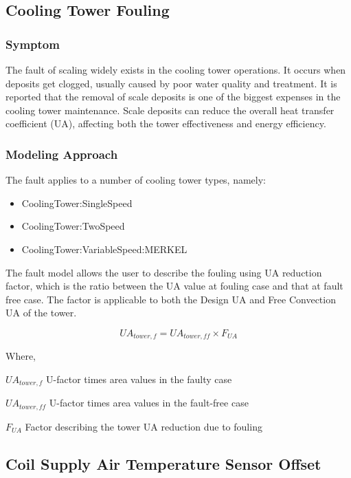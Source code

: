 \subsection{Cooling Tower Fouling}\label{cooling-tower-fouling}

\subsubsection{Symptom}

The fault of scaling widely exists in the cooling tower operations. It occurs when deposits get clogged, usually caused by poor water quality and treatment. It is reported that the removal of scale deposits is one of the biggest expenses in the cooling tower maintenance. Scale deposits can reduce the overall heat transfer coefficient (UA), affecting both the tower effectiveness and energy efficiency.

\subsubsection{Modeling Approach}

The fault applies to a number of cooling tower types, namely:

\begin{itemize}
\tightlist
\item
  CoolingTower:SingleSpeed
\item
  CoolingTower:TwoSpeed
\item
  CoolingTower:VariableSpeed:MERKEL
\end{itemize}

The fault model allows the user to describe the fouling using UA reduction factor, which is the ratio between the UA value at fouling case and that at fault free case. The factor is applicable to both the Design UA and Free Convection UA of the tower. 

\begin{equation}
UA_{tower,f} = UA_{tower,ff} \times F_{UA}
\end{equation}

Where,

\(UA_{tower,f}\) U-factor times area values in the faulty case

\(UA_{tower,ff}\) U-factor times area values in the fault-free case

\(F_{UA}\) Factor describing the tower UA reduction due to fouling


\subsection{Coil Supply Air Temperature Sensor Offset}\label{coil-supply-air-temperature-sensor-offset}

